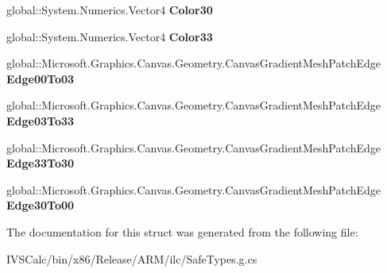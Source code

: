 \begin{DoxyCompactItemize}
global\+::\+System.\+Numerics.\+Vector4 {\bfseries Color30}
\item 
\mbox{\label{struct_microsoft_1_1_graphics_1_1_canvas_1_1_geometry_1_1_canvas_gradient_mesh_patch_aae12a03636c55a0a23e4f3a081e0349a}} 
global\+::\+System.\+Numerics.\+Vector4 {\bfseries Color33}
\item 
\mbox{\label{struct_microsoft_1_1_graphics_1_1_canvas_1_1_geometry_1_1_canvas_gradient_mesh_patch_a2d63359db31e406bb87c9474f6653414}} 
global\+::\+Microsoft.\+Graphics.\+Canvas.\+Geometry.\+Canvas\+Gradient\+Mesh\+Patch\+Edge {\bfseries Edge00\+To03}
\item 
\mbox{\label{struct_microsoft_1_1_graphics_1_1_canvas_1_1_geometry_1_1_canvas_gradient_mesh_patch_a631d94ec96f1c4a82bfd540871a3d9ac}} 
global\+::\+Microsoft.\+Graphics.\+Canvas.\+Geometry.\+Canvas\+Gradient\+Mesh\+Patch\+Edge {\bfseries Edge03\+To33}
\item 
\mbox{\label{struct_microsoft_1_1_graphics_1_1_canvas_1_1_geometry_1_1_canvas_gradient_mesh_patch_ab45a9f23483515d12d198e195c7fc859}} 
global\+::\+Microsoft.\+Graphics.\+Canvas.\+Geometry.\+Canvas\+Gradient\+Mesh\+Patch\+Edge {\bfseries Edge33\+To30}
\item 
\mbox{\label{struct_microsoft_1_1_graphics_1_1_canvas_1_1_geometry_1_1_canvas_gradient_mesh_patch_ab95e926cac9748fa707bbde4c943a0c7}} 
global\+::\+Microsoft.\+Graphics.\+Canvas.\+Geometry.\+Canvas\+Gradient\+Mesh\+Patch\+Edge {\bfseries Edge30\+To00}
\end{DoxyCompactItemize}


The documentation for this struct was generated from the following file\+:\begin{DoxyCompactItemize}
\item 
I\+V\+S\+Calc/bin/x86/\+Release/\+A\+R\+M/ilc/Safe\+Types.\+g.\+cs\end{DoxyCompactItemize}
